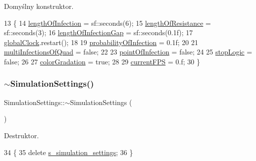 Domyślny konstruktor. 
\begin{DoxyCode}
13 \{
14     \mbox{\hyperlink{class_simulation_settings_a9a2b45617e4b4899da8af7905fa75a40}{lengthOfInfection}} = sf::seconds(6);
15     \mbox{\hyperlink{class_simulation_settings_a1c7091242ba583df542bd22643ccc509}{lengthOfResistance}} = sf::seconds(3);
16     \mbox{\hyperlink{class_simulation_settings_a0d1b39d5cc136b5a3db2ddf61e4a055d}{lengthOfInfectionGap}} = sf::seconds(0.1f);
17     \mbox{\hyperlink{class_simulation_settings_acc1792d778ba9cd1d88d5e86a23373fb}{globalClock}}.restart();
18 
19     \mbox{\hyperlink{class_simulation_settings_a340d245affa1454fb60ddead2d2e133b}{probabilityOfInfection}} = 0.1f;
20 
21     \mbox{\hyperlink{class_simulation_settings_ad283e14644ea7fc2dc2713841cd2620f}{multiInfectionsOfQuad}} = \textcolor{keyword}{false};
22 
23     \mbox{\hyperlink{class_simulation_settings_a3cf918e098904961a658c38047f607fd}{pointOfInfection}} = \textcolor{keyword}{false};
24 
25     \mbox{\hyperlink{class_simulation_settings_a5196bd793ff7383a45fe9d4041cc0e97}{stopLogic}} = \textcolor{keyword}{false};
26 
27     \mbox{\hyperlink{class_simulation_settings_a131a5c0b576e510b4c61c3c19b0efe81}{colorGradation}} = \textcolor{keyword}{true};
28 
29     \mbox{\hyperlink{class_simulation_settings_a12861fbda2986c211cdeb3a59e38040b}{currentFPS}} = 0.f;
30 \}
\end{DoxyCode}
\mbox{\label{class_simulation_settings_a7f09bfc79639238aa08fee0f6f2d0548}} 
\subsubsection{\texorpdfstring{$\sim$\+Simulation\+Settings()}{~SimulationSettings()}}
{\footnotesize\ttfamily Simulation\+Settings\+::$\sim$\+Simulation\+Settings (\begin{DoxyParamCaption}{ }\end{DoxyParamCaption})\hspace{0.3cm}{\ttfamily [private]}}

Destruktor. 
\begin{DoxyCode}
34 \{
35     \textcolor{keyword}{delete} \mbox{\hyperlink{class_simulation_settings_a725fb3d79c85db8cd446425fac82b50a}{s\_simulation\_settings}};
36 \}
\end{DoxyCode}


